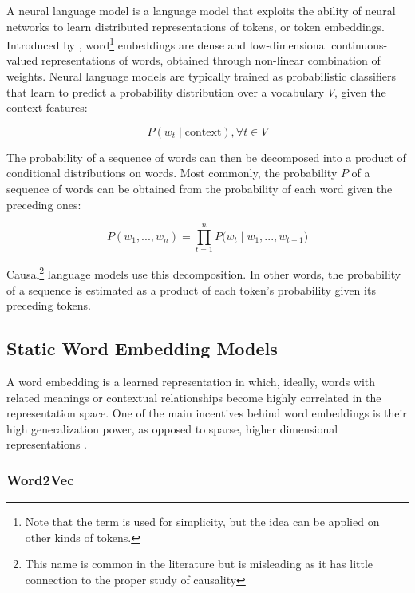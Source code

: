 A neural language model is a language model that exploits the ability of neural networks to learn distributed representations of tokens, or token embeddings. Introduced by \citet{bengio2000neural}, word\footnote{Note that the term  is used for simplicity, but the idea can be applied on other kinds of tokens.} embeddings are dense and low-dimensional continuous-valued representations of words, obtained through non-linear combination of weights. Neural language models are typically trained as probabilistic classifiers that learn to predict a probability distribution over a vocabulary $V$, given the context features:

\begin{equation}
    P(w_t \mid \mathrm{context}), \forall t\in V    
\end{equation}

The probability of a sequence of words can then be decomposed into a product of conditional distributions on words. Most commonly, the probability $P$ of a sequence of words can be obtained from the probability of each word given the preceding ones:

\begin{equation}
    P(w_1, ..., w_n) = \prod_{t=1}^{n} P\bigl(w_t \mid w_1, ..., w_{t-1}\bigr)
\label{equation:causal-distribution}
\end{equation}

Causal\footnote{This name is common in the literature but is misleading as it has little connection to the proper study of causality} language models use this decomposition. In other words, the probability of a sequence is estimated as a product of each token's probability given its preceding tokens.

\subsection{Static Word Embedding Models}

A word embedding is a learned representation in which, ideally, words with related meanings or contextual relationships become highly correlated in the representation space. One of the main incentives behind word embeddings is their high generalization power, as opposed to sparse, higher dimensional representations \citep{bengio2000neural}.

\subsubsection{Word2Vec}

